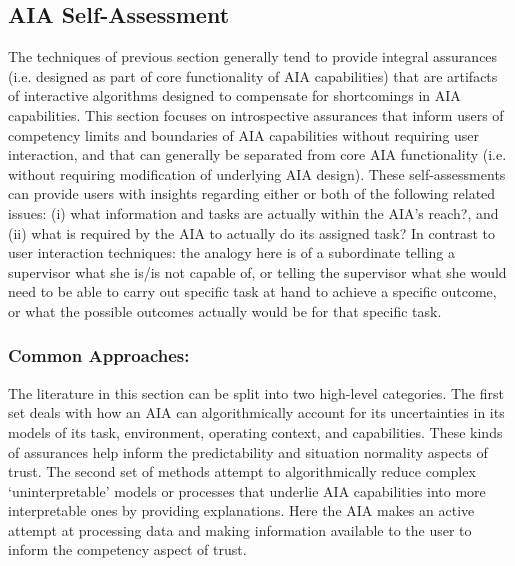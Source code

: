 \subsection{AIA Self-Assessment} \label{sec:aia_self_assessment}

The techniques of previous section generally tend to provide integral assurances (i.e. designed as part of core functionality of AIA capabilities) that are artifacts of interactive algorithms designed to compensate for shortcomings in AIA capabilities. This section focuses on introspective assurances that inform users of competency limits and boundaries of AIA capabilities without requiring user interaction, and that can generally be separated from core AIA functionality (i.e. without requiring modification of underlying AIA design).  These self-assessments can provide users with insights regarding either or both of the following related issues: (i) what information and tasks are actually within the AIA's reach?, and (ii) what is required by the AIA to actually do its assigned task? 
In contrast to user interaction techniques: the analogy here is of a subordinate telling a supervisor what she is/is not capable of, or telling the supervisor what she would need to be able to carry out specific task at hand to achieve a specific outcome, or what the possible outcomes actually would be for that specific task. 

\subsubsection{Common Approaches:}
The literature in this section can be split into two high-level categories. 
The first set deals with how an AIA can algorithmically account for its uncertainties in its models of its task, environment, operating context, and capabilities. 
These kinds of assurances help inform the predictability and situation normality aspects of trust. 
The second set of methods attempt to algorithmically reduce complex `uninterpretable' models or processes that underlie AIA capabilities into more interpretable ones by providing explanations. 
Here the AIA makes an active attempt at processing data and making information available to the user to inform the competency aspect of trust. %

